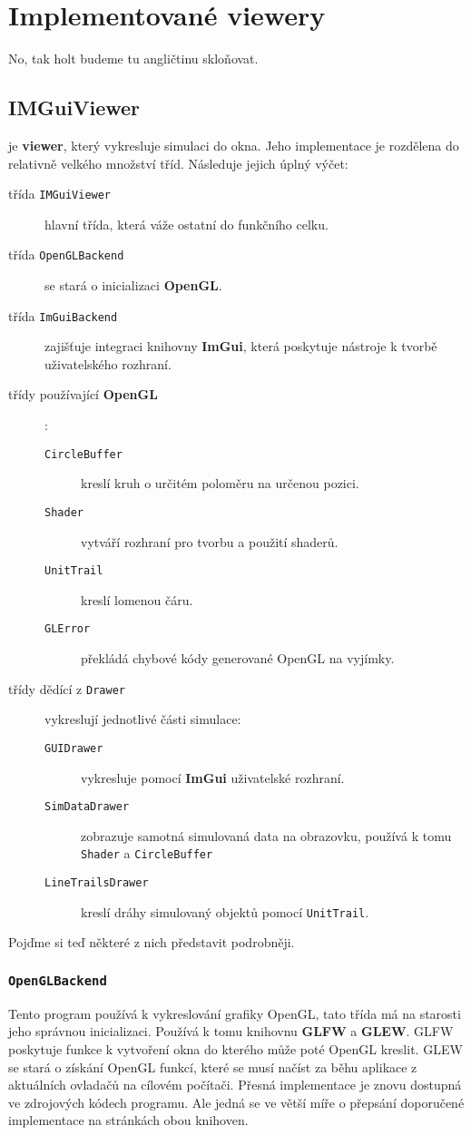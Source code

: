\chapter{Implementované viewery}
No, tak holt budeme tu angličtinu skloňovat.
\section{IMGuiViewer}
je \textbf{viewer}, který vykresluje simulaci do okna. Jeho implementace je rozdělena do relativně velkého množství tříd. Následuje jejich úplný výčet:
\begin{description}
	\item[třída \texttt{IMGuiViewer}] hlavní třída, která váže ostatní do funkčního celku.
	\item[třída \texttt{OpenGLBackend}] se stará o inicializaci \textbf{OpenGL}.
	\item[třída \texttt{ImGuiBackend}] zajišťuje integraci knihovny \textbf{ImGui}, která poskytuje nástroje k tvorbě uživatelského rozhraní.
	\item[třídy používající \textbf{OpenGL}] :
	\begin{description}
		\item[\texttt{CircleBuffer}] kreslí kruh o určitém poloměru na určenou pozici.
		\item[\texttt{Shader}] vytváří rozhraní pro tvorbu a použití shaderů.
		\item[\texttt{UnitTrail}] kreslí lomenou čáru.
		\item[\texttt{GLError}] překládá chybové kódy generované OpenGL na vyjímky.
	\end{description}
	\item[třídy dědící z \texttt{Drawer}] vykreslují jednotlivé části simulace:
	\begin{description}
		\item[\texttt{GUIDrawer}]vykresluje pomocí \textbf{ImGui} uživatelské rozhraní.
		\item[\texttt{SimDataDrawer}] zobrazuje samotná simulovaná data na obrazovku, používá k tomu \texttt{Shader} a \texttt{CircleBuffer}
		\item[\texttt{LineTrailsDrawer}]  kreslí dráhy simulovaný objektů pomocí \texttt{UnitTrail}.
	\end{description}
\end{description}
Pojďme si teď některé z nich představit podrobněji.
\subsection{\texttt{OpenGLBackend}}
Tento program používá k vykreslování grafiky OpenGL, tato třída má na starosti jeho správnou inicializaci. Používá k tomu knihovnu \textbf{GLFW} a \textbf{GLEW}.
GLFW poskytuje funkce k vytvoření okna do kterého může poté OpenGL kreslit.
GLEW se stará o získání OpenGL funkcí, které se musí načíst za běhu aplikace z aktuálních ovladačů na cílovém počítači.
Přesná implementace je znovu dostupná ve zdrojových kódech programu. Ale jedná se ve větší míře o přepsání doporučené implementace na stránkách obou knihoven.
